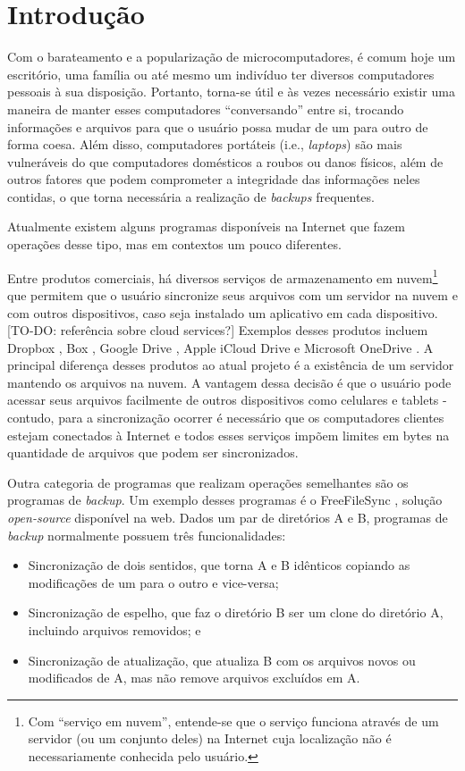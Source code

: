 \chapter{Introdução}
\label{introducao}
Com o barateamento e a popularização de microcomputadores, é comum hoje um escritório, uma família ou até mesmo um indivíduo ter diversos computadores pessoais à sua disposição.
Portanto, torna-se útil e às vezes necessário existir uma maneira de manter esses computadores ``conversando'' entre si, trocando informações e arquivos para que o usuário possa mudar de um para outro de forma coesa.
Além disso, computadores portáteis (i.e., \textit{laptops}) são mais vulneráveis do que computadores domésticos a roubos ou danos físicos, além de outros fatores que podem comprometer a integridade das informações neles contidas, o que torna necessária a realização de \textit{backups} frequentes.

Atualmente existem alguns programas disponíveis na Internet que fazem operações desse tipo, mas em contextos um pouco diferentes.

Entre produtos comerciais, há diversos serviços de armazenamento em nuvem\footnote{Com ``serviço em nuvem'', entende-se que o serviço funciona através de um servidor (ou um conjunto deles) na Internet cuja localização não é necessariamente conhecida pelo usuário.\cite{mell2011nist}} que permitem que o usuário sincronize seus arquivos com um servidor na nuvem e com outros dispositivos, caso seja instalado um aplicativo em cada dispositivo. 
[TO-DO: referência sobre cloud services?]
Exemplos desses produtos incluem Dropbox \cite{dropbox}, Box \cite{box}, Google Drive \cite{googledrive}, Apple iCloud Drive \cite{icloud} e Microsoft OneDrive \cite{onedrive}.
A principal diferença desses produtos ao atual projeto é a existência de um servidor mantendo os arquivos na nuvem.
A vantagem dessa decisão é que o usuário pode acessar seus arquivos facilmente de outros dispositivos como celulares e tablets \-- contudo, para a sincronização ocorrer é necessário que os computadores clientes estejam conectados à Internet e todos esses serviços impõem limites em bytes na quantidade de arquivos que podem ser sincronizados.

Outra categoria de programas que realizam operações semelhantes são os programas de \textit{backup}.
Um exemplo desses programas é o FreeFileSync \cite{freefilesync}, solução \textit{open-source} disponível na web.
Dados um par de diretórios A e B, programas de \textit{backup} normalmente possuem três funcionalidades:
\begin{itemize}
    \item Sincronização de dois sentidos, que torna A e B idênticos copiando as modificações de um para o outro e vice-versa;
    \item Sincronização de espelho, que faz o diretório B ser um clone do diretório A, incluindo arquivos removidos; e
    \item Sincronização de atualização, que atualiza B com os arquivos novos ou modificados de A, mas não remove arquivos excluídos em A.
\end{itemize}

